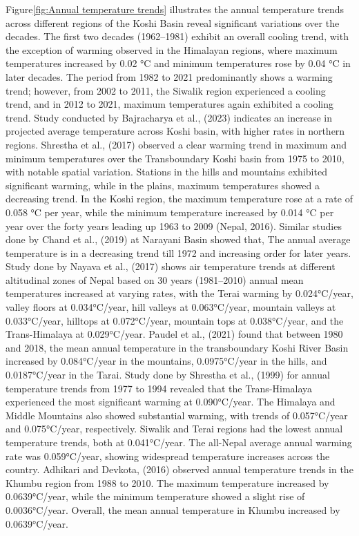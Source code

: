 Figure\ref{fig:Annual temperature trends} illustrates the annual temperature trends across different regions of the Koshi Basin reveal significant variations over the decades. The first two decades (1962--1981) exhibit an overall cooling trend, with the exception of warming observed in the Himalayan regions, where maximum temperatures increased by 0.02 °C and minimum temperatures rose by 0.04 °C in later decades. The period from 1982 to 2021 predominantly shows a warming trend; however, from 2002 to 2011, the Siwalik region experienced a cooling trend, and in 2012 to 2021, maximum temperatures again exhibited a cooling trend. Study conducted by Bajracharya et al., (2023) indicates an increase in projected average temperature across Koshi basin, with higher rates in northern regions. \textcite{shrestha_observed_2017} Shrestha et al., (2017) observed a clear warming trend in maximum and minimum temperatures over the Transboundary Koshi basin from 1975 to 2010, with notable spatial variation. Stations in the hills and mountains exhibited significant warming, while in the plains, maximum temperatures showed a decreasing trend. In the Koshi region, the maximum temperature rose at a rate of 0.058 °C per year, while the minimum temperature increased by 0.014 °C per year over the forty years leading up 1963 to 2009 \parencite{nepal_impacts_2016} (Nepal, 2016). Similar studies done by \textcite{chand_trend_2019} Chand et al., (2019) at Narayani Basin showed that, The annual average temperature is in a decreasing trend till 1972 and increasing order for later years.  Study done by \textcite{nayava_spatial_2017} Nayava et al., (2017) shows air temperature trends at different altitudinal zones of Nepal based on 30 years (1981--2010) annual mean temperatures increased at varying rates, with the Terai warming by 0.024°C/year, valley floors at 0.034°C/year, hill valleys at 0.063°C/year, mountain valleys at 0.033°C/year, hilltops at 0.072°C/year, mountain tops at 0.038°C/year, and the Trans-Himalaya at 0.029°C/year. \textcite{paudel_climate_2021}Paudel et al., (2021) found that between 1980 and 2018, the mean annual temperature in the transboundary Koshi River Basin increased by 0.084°C/year in the mountains, 0.0975°C/year in the hills, and 0.0187°C/year in the Tarai. Study done by \textcite{shrestha_maximum_1999} Shrestha et al., (1999) for annual temperature trends from 1977 to 1994 revealed that the Trans-Himalaya experienced the most significant warming at 0.090°C/year. The Himalaya and Middle Mountains also showed substantial warming, with trends of 0.057°C/year and 0.075°C/year, respectively. Siwalik and Terai regions had the lowest annual temperature trends, both at 0.041°C/year. The all-Nepal average annual warming rate was 0.059°C/year, showing widespread temperature increases across the country. \textcite{adhikari_x_2016} Adhikari and Devkota, (2016) observed annual temperature trends in the Khumbu region from 1988 to 2010. The maximum temperature increased by 0.0639°C/year, while the minimum temperature showed a slight rise of 0.0036°C/year. Overall, the mean annual temperature in Khumbu increased by 0.0639°C/year.


